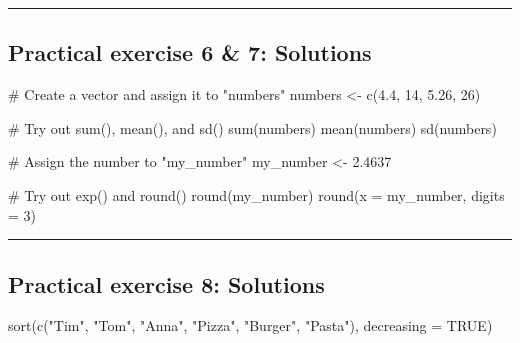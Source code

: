 \documentclass[
  letterpaper,
  DIV=11,
  numbers=noendperiod]{scrartcl}
\newenvironment{Shaded}{\begin{snugshade}}{\end{snugshade}}
\newcommand{\AttributeTok}[1]{\textcolor[rgb]{0.40,0.45,0.13}{#1}}
\newcommand{\CommentTok}[1]{\textcolor[rgb]{0.37,0.37,0.37}{#1}}
\newcommand{\ConstantTok}[1]{\textcolor[rgb]{0.56,0.35,0.01}{#1}}
\newcommand{\DecValTok}[1]{\textcolor[rgb]{0.68,0.00,0.00}{#1}}
\newcommand{\FloatTok}[1]{\textcolor[rgb]{0.68,0.00,0.00}{#1}}
\newcommand{\FunctionTok}[1]{\textcolor[rgb]{0.28,0.35,0.67}{#1}}
\newcommand{\NormalTok}[1]{\textcolor[rgb]{0.00,0.23,0.31}{#1}}
\newcommand{\OtherTok}[1]{\textcolor[rgb]{0.00,0.23,0.31}{#1}}
\newcommand{\StringTok}[1]{\textcolor[rgb]{0.13,0.47,0.30}{#1}}
\begin{document}
\begin{center}\rule{0.5\linewidth}{0.5pt}\end{center}

\subsection{Practical exercise 6 \& 7:
Solutions}\label{practical-exercise-6-7-solutions}

\begin{Shaded}
\begin{Highlighting}[]
\CommentTok{\# Create a vector and assign it to "numbers"}
\NormalTok{numbers }\OtherTok{\textless{}{-}} \FunctionTok{c}\NormalTok{(}\FloatTok{4.4}\NormalTok{, }\DecValTok{14}\NormalTok{, }\FloatTok{5.26}\NormalTok{, }\DecValTok{26}\NormalTok{)}

\CommentTok{\# Try out sum(), mean(), and sd()}
\FunctionTok{sum}\NormalTok{(numbers)}
\FunctionTok{mean}\NormalTok{(numbers)}
\FunctionTok{sd}\NormalTok{(numbers)}

\CommentTok{\# Assign the number to "my\_number"}
\NormalTok{my\_number }\OtherTok{\textless{}{-}} \FloatTok{2.4637}

\CommentTok{\# Try out exp() and round()}
\FunctionTok{round}\NormalTok{(my\_number)}
\FunctionTok{round}\NormalTok{(}\AttributeTok{x =}\NormalTok{ my\_number, }\AttributeTok{digits =} \DecValTok{3}\NormalTok{)}
\end{Highlighting}
\end{Shaded}

\begin{center}\rule{0.5\linewidth}{0.5pt}\end{center}

\subsection{Practical exercise 8:
Solutions}\label{practical-exercise-8-solutions}

\begin{Shaded}
\begin{Highlighting}[]
\FunctionTok{sort}\NormalTok{(}\FunctionTok{c}\NormalTok{(}\StringTok{"Tim"}\NormalTok{, }\StringTok{"Tom"}\NormalTok{, }\StringTok{"Anna"}\NormalTok{, }\StringTok{"Pizza"}\NormalTok{, }\StringTok{"Burger"}\NormalTok{, }\StringTok{"Pasta"}\NormalTok{), }\AttributeTok{decreasing =} \ConstantTok{TRUE}\NormalTok{)}
\end{Highlighting}
\end{Shaded}
\end{document}
